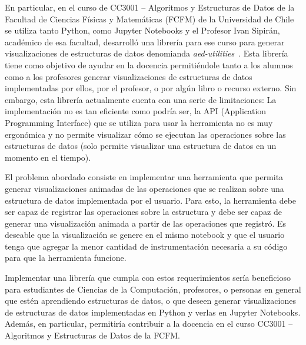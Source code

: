 En particular, en el curso de CC3001 -- Algoritmos y Estructuras de Datos de la Facultad de Ciencias Físicas y Matemáticas (FCFM) de la Universidad de Chile se utiliza tanto Python, como Jupyter Notebooks y el Profesor Ivan Sipirán, académico de esa facultad, desarrolló una librería para ese curso para generar visualizaciones de estructuras de datos denomianda \textit{aed-utilities}~\cite{aed-utilities}. Esta librería tiene como objetivo de ayudar en la docencia permitiéndole tanto a los alumnos como a los profesores generar visualizaciones de estructuras de datos implementadas por ellos, por el profesor, o por algún libro o recurso externo. Sin embargo, esta librería actualmente cuenta con una serie de limitaciones: La implementación no es tan eficiente como podría ser, la API (Application Programming Interface) que se utiliza para usar la herramienta no es muy ergonómica y no permite visualizar cómo se ejecutan las operaciones sobre las estructuras de datos (solo permite visualizar una estructura de datos en un momento en el tiempo).

El problema abordado consiste en implementar una herramienta que permita generar visualizaciones animadas de las operaciones que se realizan sobre una estructura de datos implementada por el usuario. Para esto, la herramienta debe ser capaz de registrar las operaciones sobre la estructura y debe ser capaz de generar una visualización animada a partir de las operaciones que registró. Es deseable que la visualización se genere en el mismo notebook y que el usuario tenga que agregar la menor cantidad de instrumentación necesaria a su código para que la herramienta funcione.

Implementar una librería que cumpla con estos requerimientos sería beneficioso para estudiantes de Ciencias de la Computación, profesores, o personas en general que estén aprendiendo estructuras de datos, o que deseen generar visualizaciones de estructuras de datos implementadas en Python y verlas en Jupyter Notebooks. Además, en particular, permitiría contribuir a la docencia en el curso CC3001 -- Algoritmos y Estructuras de Datos de la FCFM.
